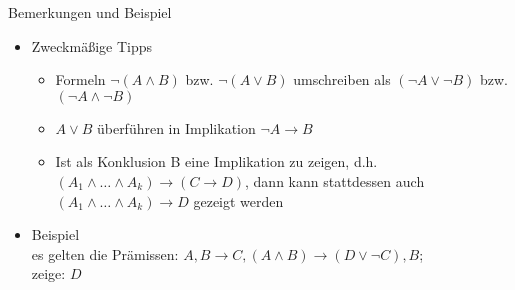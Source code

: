 
\begin{frame}{Bemerkungen und Beispiel}
	\begin{itemize}
		\item Zweckmäßige Tipps
		\begin{itemize}
			\item Formeln $\neg (A \land B)$ bzw. $\neg (A \lor B)$ umschreiben als $(\neg A \lor \neg B)$ bzw. $(\neg A \land \neg B)$
			\item $A \lor B$ überführen in Implikation $\neg A \rightarrow B$
			\item Ist als Konklusion B eine Implikation zu zeigen, d.h.\\
			$(A_1 \land \ldots \land A_k) \rightarrow (C \rightarrow D)$, dann kann stattdessen auch\\
			$(A_1 \land \ldots \land A_k) \rightarrow D$ gezeigt werden
		\end{itemize}
		\item Beispiel\\
			es gelten die Prämissen: $A, B \rightarrow C, (A \land B) \rightarrow (D \lor \neg C), B$;\\
			zeige: $D$
	\end{itemize}
\end{frame}


